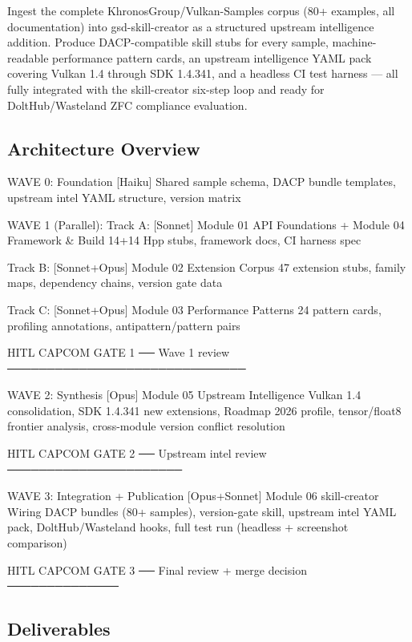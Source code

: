 \documentclass[11pt,letterpaper]{article}
\begin{document}
Ingest the complete KhronosGroup/Vulkan-Samples corpus (80+ examples, all documentation) into gsd-skill-creator as a structured upstream intelligence addition. Produce DACP-compatible skill stubs for every sample, machine-readable performance pattern cards, an upstream intelligence YAML pack covering Vulkan 1.4 through SDK 1.4.341, and a headless CI test harness --- all fully integrated with the skill-creator six-step loop and ready for DoltHub/Wasteland ZFC compliance evaluation.

\subsection{Architecture Overview}

\begin{asciibox}
WAVE 0: Foundation
  [Haiku] Shared sample schema, DACP bundle templates,
          upstream intel YAML structure, version matrix

WAVE 1 (Parallel):
  Track A: [Sonnet] Module 01 API Foundations
           + Module 04 Framework & Build
           14+14 Hpp stubs, framework docs, CI harness spec

  Track B: [Sonnet+Opus] Module 02 Extension Corpus
           47 extension stubs, family maps,
           dependency chains, version gate data

  Track C: [Sonnet+Opus] Module 03 Performance Patterns
           24 pattern cards, profiling annotations,
           antipattern/pattern pairs

HITL CAPCOM GATE 1 ── Wave 1 review ──────────────────────────────

WAVE 2: Synthesis
  [Opus] Module 05 Upstream Intelligence
         Vulkan 1.4 consolidation, SDK 1.4.341 new extensions,
         Roadmap 2026 profile, tensor/float8 frontier analysis,
         cross-module version conflict resolution

HITL CAPCOM GATE 2 ── Upstream intel review ──────────────────────

WAVE 3: Integration + Publication
  [Opus+Sonnet] Module 06 skill-creator Wiring
         DACP bundles (80+ samples), version-gate skill,
         upstream intel YAML pack, DoltHub/Wasteland hooks,
         full test run (headless + screenshot comparison)

HITL CAPCOM GATE 3 ── Final review + merge decision ──────────────
\end{asciibox}

\subsection{Deliverables}
\end{document}

